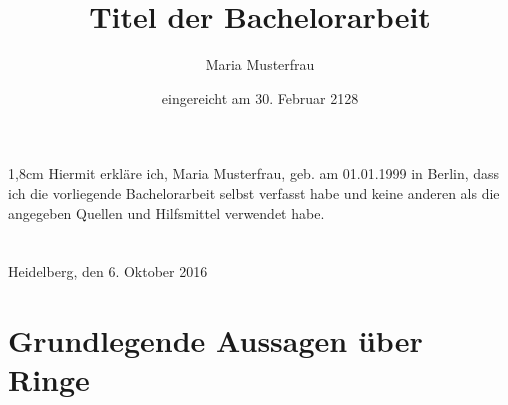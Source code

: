 \documentclass[abstracton,titlepage=on,toc=bib]{scrartcl}
\theoremstyle{plain}
\theoremstyle{definition}
\begin{document}
\titlehead{Ruprecht-Karls-Universität Heidelberg\\ Fakultät für Mathematik und Informatik\\ Mathematisches Institut}
\subject{Bachelorarbeit}
\title{Titel der Bachelorarbeit}
\author{Maria Musterfrau}
\date{eingereicht am 30. Februar 2128}
\publishers{betreut von Prof. Dr. Jane Doe}




\maketitle


\begin{addmargin*}{1,8cm}
\vspace*{\fill}
Hiermit erkläre ich, Maria Musterfrau, geb. am 01.01.1999 in Berlin, dass ich die vorliegende Bachelorarbeit selbst verfasst habe und keine anderen als die angegeben Quellen und Hilfsmittel verwendet habe.\\~\\~\\
Heidelberg, den 6. Oktober 2016\hfill\makebox[4cm]{\hrulefill}
\vspace*{\fill}
\end{addmargin*}\break




\break


\tableofcontents
\break
{}

\pagebreak
\section{Grundlegende Aussagen über Ringe}


\break
\printbibliography
\end{document}
